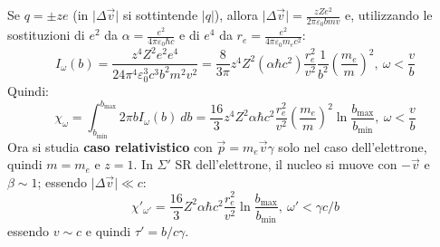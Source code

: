 \documentclass[10pt, a4paper]{scrartcl}
\numberwithin{equation}{subsection}
\theoremstyle{style1}
\begin{document}
Se $q = \pm ze$ (in $\lvert \Delta \vec{v} \rvert$ si sottintende $|q|$), allora $\lvert \Delta \vec{v} \rvert = \frac{zZe^2}{2\pi \varepsilon _0 bmv}$ e, utilizzando le sostituzioni di $e^2$ da $\alpha  = \frac{e^2}{4\pi \varepsilon _0 \hbar  c}$ e di $e^4$ da $r_e = \frac{e^2}{4\pi \varepsilon _0 m_e c^2}$:
\begin{equation}
	I_\omega (b) = \frac{z^4 Z^2 e^2 e^4}{24 \pi^4 \varepsilon _0^3 c^3 b^2 m^2 v^2} = \frac{8}{3\pi} z^4 Z^2 (\alpha \hbar c^2) \frac{r_e^2}{v^2} \frac{1}{b^2} \left(\frac{m_e}{m}\right) ^2 , \ \omega < \frac{v}{b}
\end{equation}
Quindi:
\begin{equation}
	\chi _\omega = \int_{b_\text{min}}^{b_\text{max}} 2\pi b I_\omega(b) \ db = \frac{16}{3} z^4 Z^2 \alpha \hbar c^2 \frac{r_e^2}{v^2} \left(\frac{m_e}{m}\right) ^2 \ln \frac{b_\text{max}}{b_\text{min}} , \ \omega < \frac{v}{b}
\end{equation}
Ora si studia \textbf{caso relativistico} con $\vec{p} = m_e \vec{v}\gamma$ solo nel caso dell'elettrone, quindi $m=m_e$ e $z=1$. In $\Sigma'$ SR dell'elettrone, il nucleo si muove con $-\vec{v}$ e $\beta \sim 1$; essendo $\lvert \Delta \vec{v} \rvert  \ll c$:
\[
\chi '_{\omega'} = \frac{16}{3} Z^2 \alpha  \hbar  c^2 \frac{r_e^2}{v^2} \ln \frac{b_\text{max}}{b_\text{min}}, \ \omega' < \gamma c / b
\] 
essendo $v \sim c$ e quindi $\tau ' = b / c\gamma$. 
\end{document}
